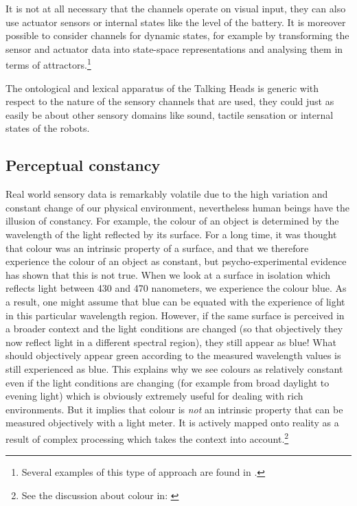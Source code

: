 It is not at all necessary that the channels operate 
on visual input, they can also use actuator sensors or internal states
like the level of the battery. It is moreover possible to 
consider channels for dynamic states, for 
example by transforming the sensor and actuator
data into state-space representations and 
analysing them in terms of attractors.\footnote{
Several examples of this type of approach are 
found in \cite{Port:1995}.}

The ontological and lexical apparatus of the Talking Heads is 
generic with respect to the nature of the sensory channels
that are used, they could just as easily be about other sensory 
domains like sound, tactile sensation or internal states
of the robots.

\subsection{Perceptual constancy}

Real world sensory data is remarkably volatile due to the 
high variation and constant change of 
our physical environment, nevertheless human beings have 
the illusion of constancy. 
For example, the colour of an object is determined 
by the wavelength of the light reflected by its surface. 
For a long time, it 
was thought that colour was an intrinsic property of a 
surface, and that we therefore experience the colour of 
an object as constant, but psycho-experimental evidence has shown 
that this is not true. When we look at a surface in 
isolation which reflects light between 
430 and 470 nanometers, we experience 
the colour blue. As a result, one might assume
that blue can be equated
with the experience of light in this particular wavelength 
region. However, if the same surface is perceived
in a broader context and the light conditions 
are changed (so that objectively they now 
reflect light in a different spectral region), they still 
appear as blue! What should objectively 
appear green according to the measured wavelength 
values is still experienced
as blue. This explains why we see colours
as relatively constant even if the light conditions
are changing (for example from broad daylight to 
evening light) which is obviously extremely useful 
for dealing with rich environments. But it 
implies that colour is {\itshape not}
an intrinsic property that can be measured objectively 
with a light meter. It is actively mapped onto reality 
as a result of complex processing which takes the 
context into account.\footnote{
See the discussion about colour 
in: \cite{Varela:1991}}

